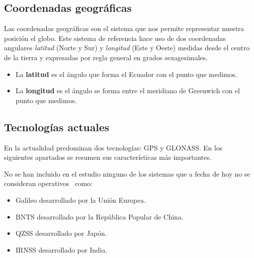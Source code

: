 \subsection{Coordenadas geográficas}
\label{sec:coordenadas}

Las coordenadas geográficas son el sistema que nos permite representar nuestra posición el
globo. Este sistema de referencia hace uso de dos coordenadas angulares \emph{latitud} (Norte y Sur)
y \emph{longitud} (Este y Oeste) medidas desde el centro de la tierra y expresadas por regla general
en grados sexagesimales.

\begin{itemize}
  \item La \textbf{latitud} es el ángulo que forma el Ecuador con el punto que medimos.
  \item La \textbf{longitud} es el ángulo se forma entre el meridiano de Greenwich con el punto que
    medimos.
\end{itemize}

\subsection{Tecnologías actuales}

En la actualidad predominan dos tecnologías: \acf{GPS} y \acf{GLONASS}. En los siguientes apartados
se resumen sus características más importantes.

No se han incluido en el estudio ninguno de los sistemas que a fecha de hoy no se consideran
operativos~\cite{SPSA} como:

\begin{itemize}
  \item Galileo desarrollado por la Unión Europea.
  \item \acf{BNTS} desarrollado por la República Popular de China.
  \item \acf{QZSS} desarrollado por Japón.
  \item \acf{IRNSS} desarrollado por India.
\end{itemize}

